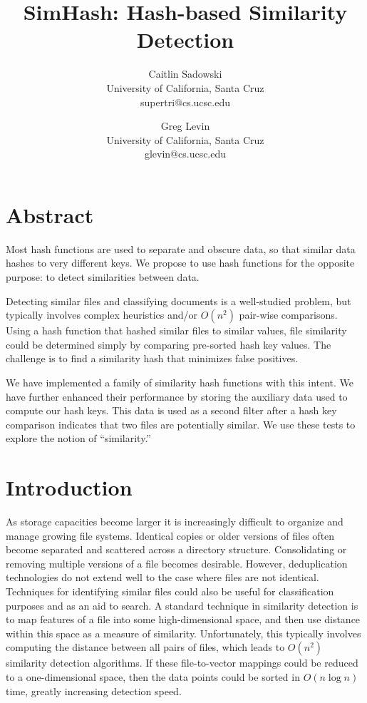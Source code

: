 \documentclass[10pt, twocolumn]{article}
\begin{document}
\title{SimHash: Hash-based Similarity Detection}

\author{Caitlin Sadowski\\
University of California, Santa Cruz\\
supertri@cs.ucsc.edu\\
\and
Greg Levin\\
University of California, Santa Cruz\\
glevin@cs.ucsc.edu}


\def\copyrightspace{}

\maketitle

\section{Abstract}

Most hash functions are used to separate and obscure data, so that similar data hashes to very different keys.  We propose to use hash functions for the opposite purpose: to detect similarities between data. 

Detecting similar files and classifying documents is a well-studied problem, but typically involves complex heuristics and/or $O(n^2)$ pair-wise comparisons. Using a hash function that hashed similar files to similar values, file similarity could be determined simply by comparing pre-sorted hash key values.  The challenge is to find a similarity hash that minimizes false positives. 

We have implemented a family of similarity hash functions with this intent.  We have further enhanced their performance by storing the auxiliary data used to compute our hash keys.  This data is used as a second filter after a hash key comparison indicates that two files are potentially similar.  We use these tests to explore the notion of ``similarity.''


\section{Introduction}

As storage capacities become larger it is increasingly difficult to organize and manage growing file systems. Identical copies or older versions of files often become separated and scattered across a directory structure. Consolidating or removing multiple versions of a file becomes desirable. However, deduplication technologies do not extend well to the case where files are not identical. Techniques for identifying similar files could also be useful for classification purposes and as an aid to search.  A standard technique in similarity detection is to map features of a file into some high-dimensional space, and then use distance within this space as a measure of similarity.  Unfortunately, this typically involves computing the distance between all pairs of files, which leads to $O(n^2)$ similarity detection algorithms.  If these file-to-vector mappings could be reduced to a one-dimensional space, then the data points could be sorted in $O(n \log n)$ time, greatly increasing detection speed.
\end{document}
